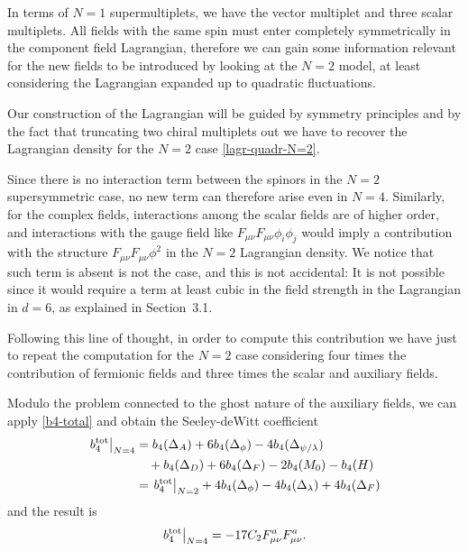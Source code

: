 In terms of $N=1$ supermultiplets, we have the vector multiplet and three scalar multiplets. All fields with the same spin must enter completely symmetrically in the component field Lagrangian, therefore we can gain some information relevant for the new fields to be introduced by looking at the $N=2$ model, at least considering the Lagrangian expanded up to quadratic fluctuations.

Our construction of the Lagrangian will be guided by symmetry principles and by the fact that truncating two chiral multiplets out we have to recover the Lagrangian density for the $N=2$ case \eqref{lagr-quadr-N=2}.

Since there is no interaction term between the spinors in the $N=2$ supersymmetric case, no new term can therefore arise even in $N=4$.
Similarly, for the complex fields, interactions among the scalar fields are of higher order, and interactions with the gauge field like $F_{\mu\nu}F_{\mu\nu}\phi_i\phi_j$ would imply a contribution with the structure $F_{\mu\nu}F_{\mu\nu}\phi^2$ in the $N=2$ Lagrangian density. We notice that such term is absent is not the case, and this is not accidental: It is not possible since it would require a term at least cubic in the field strength in the Lagrangian in $d=6$, as explained in Section~3.1.

Following this line of thought, in order to compute this contribution we have just to repeat the computation for the $N=2$ case considering four times the contribution of fermionic fields and three times the scalar and auxiliary fields. 

Modulo the problem connected to the ghost nature of the auxiliary fields, we can apply \eqref{b4-total} and obtain the Seeley-deWitt coefficient
\begin{equation}
\begin{split}
\left.b_4^{ \text{tot} }\right|_{ N = 4 }
&	=
b_4(\Delta_A)
+
6 b_4(\Delta_\phi)
-
4 b_4(\Delta_{\psi/\lambda})
\\
& \quad
+
b_4(\Delta_D)
+
6 b_4(\Delta_F)
-
2 b_4(M_0)
-
b_4(H)\\
& =
\left.b_4^{ \text{tot} }\right|_{ N = 2 }
+
4 b_4(\Delta_\phi)
-
4 b_4(\Delta_\lambda)
+
4 b_4(\Delta_F)
\end{split}
\end{equation}
and the result is
\begin{equation}
\left.b_4^{ \text{tot} }\right|_{ N = 4 }
=
 -17 C_2 F^a_{ \mu \nu }  F^a_{ \mu \nu } .
\end{equation}



